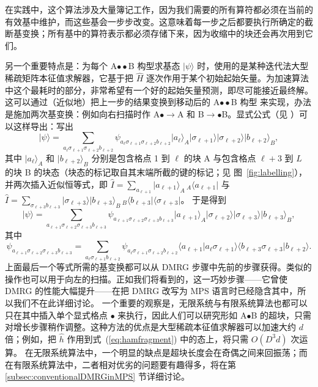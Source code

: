 \documentclass[a4paper,10pt,oneside,onecolumn,1p,times]{elsarticle}
\newcommand{\bra}[1]{\mbox{$\langle #1  |$}}
\newcommand{\ket}[1]{\mbox{$| #1  \rangle$}}
\newcommand{\braket}[2]{\mbox{$\langle #1  | #2 \rangle$}} 	%
\begin{document}
在实践中，这个算法涉及大量簿记工作，因为我们需要的所有算符都必须在当前的有效基中维护，而这些基会一步步改变。这意味着每一步之后都要执行所确定的截断基变换；所有基中的算符表示都必须存储下来，因为收缩中的块还会再次用到它们。

另一个重要特点是：为每个 A$\bullet\bullet$B 构型求基态 $\ket{\psi}$ 时，使用的是某种迭代法大型稀疏矩阵本征值求解器，它基于把 $\hat{H}$ 逐次作用于某个初始起始矢量。为加速算法中这个最耗时的部分，非常希望有一个好的起始矢量预测，即尽可能接近最终解。这可以通过（近似地）把上一步的结果变换到移动后的 A$\bullet\bullet$B 构型 \cite{White96} 来实现，办法是施加两次基变换：例如向右扫描时作 A$\bullet\rightarrow$A 和 B$\rightarrow\bullet$B。显式公式（见 \cite{Schollwoeck05,White96}）可以这样导出：写出
\begin{equation}
\ket{\psi} = \sum_{a_\ell\sigma_{\ell+1}\sigma_{\ell+2}b_{\ell+2}} \psi_{a_\ell\sigma_{\ell+1}\sigma_{\ell+2}b_{\ell+2}} \ket{a_\ell}_A \ket{\sigma_{\ell+1}} \ket{\sigma_{\ell+2}} \ket{b_{\ell+2}}_B,
\end{equation}
其中 $\ket{a_\ell}_A$ 和 $\ket{b_{\ell+2}}_B$ 分别是包含格点 1 到 $\ell$ 的块 A 与包含格点 $\ell+3$ 到 $L$ 的块 B 的块态（块态的标记取自其末端所截的键的标记；见 图~\ref{fig:labelling}），并两次插入近似恒等式，即 $\hat{I} = \sum_{a_{\ell+1}} \ket{a_{\ell+1}}_A {\,}_A\bra{a_{\ell+1}}$ 与
$\hat{I} = \sum_{\sigma_{\ell+3} b_{\ell+3}} \ket{\sigma_{\ell+3}}\ket{b_{\ell+3}}_B {\, }_B \bra{b_{\ell+3}} \bra{\sigma_{\ell+3}}$。
于是得到
\begin{equation}
\ket{\psi} = \sum_{a_{\ell+1}\sigma_{\ell+2}\sigma_{\ell+3}b_{\ell+3}} \psi_{a_{\ell+1}\sigma_{\ell+2}\sigma_{\ell+3}b_{\ell+3}} \ket{a_{\ell+1}}_A \ket{\sigma_{\ell+2}} \ket{\sigma_{\ell+3}} \ket{b_{\ell+3}}_B,
\end{equation}
其中
\begin{equation}
\psi_{a_{\ell+1}\sigma_{\ell+2}\sigma_{\ell+3}b_{\ell+3}} =
\sum_{a_\ell \sigma_{\ell+1} b_{\ell+2}}
\psi_{a_\ell\sigma_{\ell+1}\sigma_{\ell+2}b_{\ell+2}}
\braket{a_{\ell+1}}{a_\ell \sigma_{\ell+1}} \braket{b_{\ell+3}\sigma_{\ell+3}}{b_{\ell+2}} .
\end{equation}
上面最后一个等式所需的基变换都可以从 DMRG 步骤中先前的步骤获得。类似的操作也可以用于向左的扫描。正如我们将看到的，这一巧妙步骤——它曾使 DMRG 的性能大幅提升——在把 DMRG 改写为 MPS 语言时已经隐含其中，所以我们不在此详细讨论。
一个重要的观察是，无限系统与有限系统算法也都可以只在其中插入单个显式格点 $\bullet$ 来执行，因此人们可以研究形如 A$\bullet$B 的超块，只需对增长步骤稍作调整。这种方法的优点是大型稀疏本征值求解器可以加速大约 $d$ 倍；例如，把 $\hat{h}$ 作用到式~(\ref{eq:hamfragment}) 中的态上，将只需 $O(D^3 d)$ 次运算。
在无限系统算法中，一个明显的缺点是超块长度会在奇偶之间来回振荡；而在有限系统算法中，二者相对优劣的问题要有趣得多，将在第 \ref{subsec:conventionalDMRGinMPS} 节详细讨论。
\end{document}
